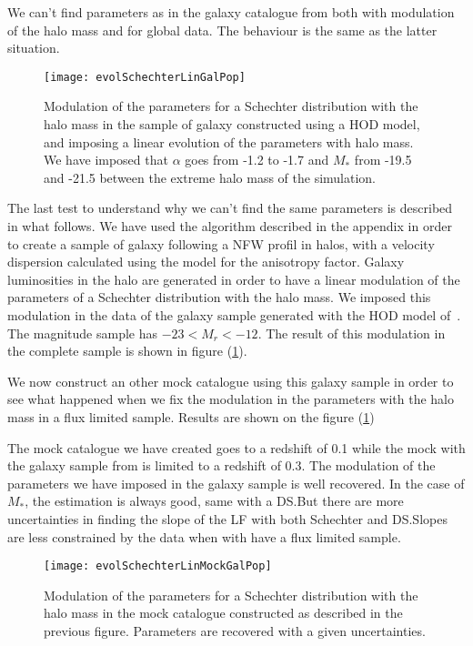 We can't find parameters as in the galaxy catalogue from \citet{Guo+11} both
with modulation of the halo mass and for global data. The behaviour is the same
as the latter situation.
%
\begin{figure}[htb]
    \centering
    \texttt{[image: evolSchechterLinGalPop]}
    \caption{Modulation of the parameters for a Schechter distribution with the
        halo mass in the sample of galaxy constructed using a HOD model, and
        imposing a linear evolution of the parameters with halo mass. We have
        imposed that $\alpha$ goes from -1.2 to -1.7 and $M_*$ from -19.5 and
        -21.5 between the extreme halo mass of the
    simulation.}
\label{fig:paramschlin}
\end{figure}

The last test to understand why we can't find the same parameters is described
in what follows. We have used the algorithm described in the appendix  in order to create a sample of galaxy following a NFW profil in
halos, with a velocity dispersion calculated using the \citet{ML05} model for
the anisotropy factor. Galaxy luminosities in the halo are generated in order
to have a linear modulation of the parameters of a Schechter distribution with
the halo mass. We imposed this modulation in the data of the galaxy sample
generated with the HOD model of~\cite{Zehavi+11}. The magnitude sample has
$-23<M_r<-12$. The result of this modulation in the complete sample
is shown in figure (\ref{fig:paramschlin}).

We now construct an other mock catalogue using this galaxy sample in order to
see what happened when we fix the modulation in the parameters with the halo
mass in a flux limited sample. Results are shown on the figure
(\ref{fig:paramschlin})

The mock catalogue we have created goes to a redshift of 0.1 while the
mock with the galaxy sample from \citet{Guo+11} is limited to a redshift of
0.3. The modulation of the parameters we have imposed in the galaxy
sample is well recovered. In the case of $M_*$, the estimation is always good,
same with a DS.\@ But there are more uncertainties in finding the slope of the
LF with both Schechter and DS.\@ Slopes are less constrained by the data when
with have a flux limited sample.
%
\begin{figure}[htb]
    \centering
    \texttt{[image: evolSchechterLinMockGalPop]}
    \caption{Modulation of the parameters for a Schechter distribution with the
    halo mass in the mock catalogue constructed as described in the previous
figure. Parameters are recovered with a given uncertainties.}
\label{fig:paramschlinmock}
\end{figure}
